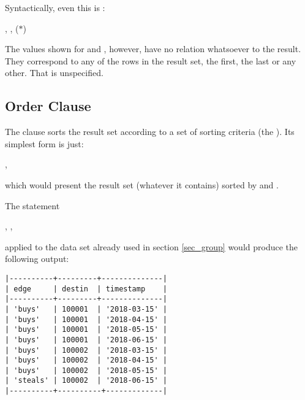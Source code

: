 Syntactically, even this is :

 ,
                 ,
                 ($\ast$)
 

The values shown for  and ,
however, have no relation whatsoever to the 
result. They correspond
to any of the rows in the result set,
the first, the last or any other.
That is unspecified.



\subsection{Order Clause}
The  clause sorts the result set
according to a set of sorting criteria (the ).
Its simplest form is just:

 , 

which would present the result set (whatever it contains)
sorted by  and .

\begin{minipage}{\textwidth}
The statement

 , 
 
 , 
\end{minipage}

applied to the data set already used in section
\ref{sec_group} would produce the following output:

\begin{minipage}{\textwidth}
\begin{verbatim}
|----------+---------+--------------|
| edge     | destin  | timestamp    |
|----------+---------+--------------|
| 'buys'   | 100001  | '2018-03-15' |
| 'buys'   | 100001  | '2018-04-15' |
| 'buys'   | 100001  | '2018-05-15' |
| 'buys'   | 100001  | '2018-06-15' |
| 'buys'   | 100002  | '2018-03-15' |
| 'buys'   | 100002  | '2018-04-15' |
| 'buys'   | 100002  | '2018-05-15' |
| 'steals' | 100002  | '2018-06-15' |
|----------+----------+-------------|
\end{verbatim}
\end{minipage}

